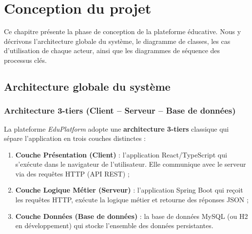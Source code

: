\chapter{Conception du projet}

Ce chapitre présente la phase de conception de la plateforme éducative. Nous y décrivons l'architecture globale du système, le diagramme de classes, les cas d'utilisation de chaque acteur, ainsi que les diagrammes de séquence des processus clés.

\section{Architecture globale du système}

\subsection{Architecture 3-tiers (Client -- Serveur -- Base de données)}

La plateforme \textit{EduPlatform} adopte une \textbf{architecture 3-tiers} classique qui sépare l'application en trois couches distinctes :

\begin{enumerate}
    \item \textbf{Couche Présentation (Client)} : l'application React/TypeScript qui s'exécute dans le navigateur de l'utilisateur. Elle communique avec le serveur via des requêtes HTTP (API REST) ;
    \item \textbf{Couche Logique Métier (Serveur)} : l'application Spring Boot qui reçoit les requêtes HTTP, exécute la logique métier et retourne des réponses JSON ;
    \item \textbf{Couche Données (Base de données)} : la base de données MySQL (ou H2 en développement) qui stocke l'ensemble des données persistantes.
\end{enumerate}

